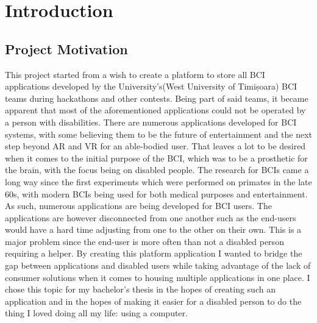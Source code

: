 \pagestyle{fancy}
\fancyhf{}%
\fancyhead[RO,LE]{\thepage}%
\fancyhead[RE]{\nouppercase{\leftmark}}%
\renewcommand{\headrulewidth}{0pt}%


\chapter{Introduction}\label{cap:intro}



\section{Project Motivation}\label{sect:motivation}
This project started from a wish to create a platform to store all BCI applications developed by the University's(West University of Timișoara) BCI teams during hackathons and other contests. Being part of said teams, it became apparent that most of the aforementioned applications could not be operated by a person with disabilities.
\vspace{\baselineskip}\newline
There are numerous applications developed for BCI systems, with some believing them to be the future of entertainment and the next step beyond AR and VR for an able-bodied user\cite{future_of_metaverse_BCI}. That leaves a lot to be desired when it comes to the initial purpose of the BCI, which was to be a prosthetic for the brain, with the focus being on disabled people. The research for BCIs came a long way since the first experiments which were performed on primates in the late 60s\cite{Fetz_1969}, with modern BCIs being used for both medical purposes and entertainment. 
\vspace{\baselineskip}\newline
As such, numerous applications are being developed for BCI users. The applications are however disconnected from one another such as the end-users would have a hard time adjusting from one to the other on their own. This is a major problem since the end-user is more often than not a disabled person requiring a helper. By creating this platform application I wanted to bridge the gap between applications and disabled users while taking advantage of the lack of consumer solutions when it comes to housing multiple applications in one place. I chose this topic for my bachelor's thesis in the hopes of creating such an application and in the hopes of making it easier for a disabled person to do the thing I loved doing all my life: using a computer.



